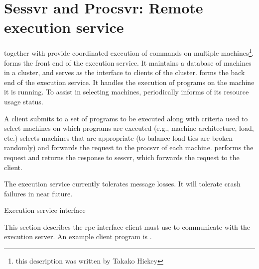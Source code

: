 \section{Sessvr and Procsvr: Remote execution service}

 together with  provide
coordinated execution of commands on multiple machines\footnote{this
description was written by Takako Hickey}.
 forms the front end of the execution service.
It maintains a database of machines in a cluster, and serves
as the interface to clients of the cluster.
 forms the back end of the execution service.
It handles the execution of programs on the machine it is running.
To assist  in selecting machines, 
periodically informs  of its resource usage status.

A client submits to  a set of programs to be executed
along with criteria used to select machines on which programs
are executed (e.g., machine architecture, load, etc.)
 selects machines that are appropriate (to balance load
ties are broken randomly) and forwards the
request to the procsvr of each machine.
 performs the request and returns the response to sessvr,
which forwards the request to the client.

The execution service currently tolerates message losses.
It will tolerate crash failures in near future.


\b{Execution service interface}

This section describes the rpc interface client must use to
communicate with the execution server.
An example client program is .


